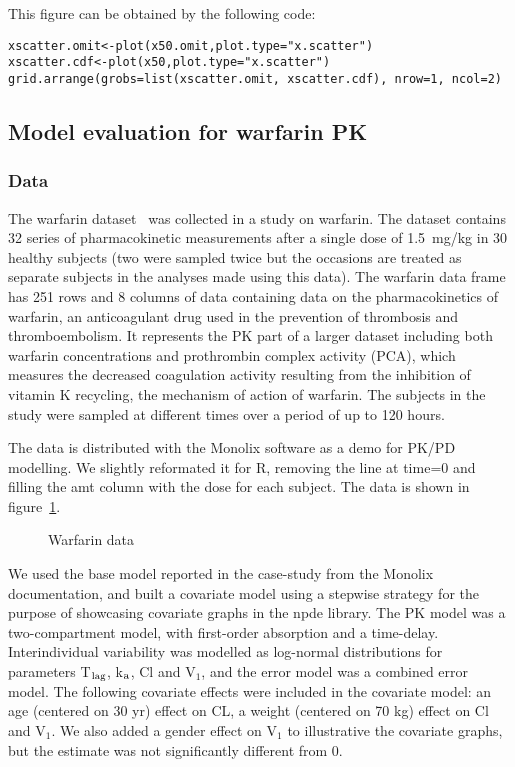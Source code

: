 This figure can be obtained by the following code:
\begin{verbatim}
xscatter.omit<-plot(x50.omit,plot.type="x.scatter")
xscatter.cdf<-plot(x50,plot.type="x.scatter")
grid.arrange(grobs=list(xscatter.omit, xscatter.cdf), nrow=1, ncol=2)
\end{verbatim} 

\clearpage
\subsection{Model evaluation for warfarin PK} \label{sec:warfarin}

\subsubsection{Data}

\hskip 18pt The warfarin dataset~\cite{OReilly68} was collected in a study on warfarin. The dataset contains 32 series of pharmacokinetic measurements after a single dose of 1.5~mg/kg in 30 healthy subjects (two were sampled twice but the occasions are treated as separate subjects in the analyses made using this data). 
The {\sf warfarin} data frame has 251 rows and 8 columns of data containing data on the pharmacokinetics of warfarin, an anticoagulant drug used in the prevention of thrombosis and thromboembolism. It represents the PK part of a larger dataset including both warfarin concentrations and prothrombin complex activity (PCA), which measures the decreased coagulation  activity resulting from the inhibition of vitamin K recycling, the mechanism of  action of warfarin. The subjects in the study were sampled at different times over a period of up to 120 hours.

The data is distributed with the {\sf Monolix} software as a demo for PK/PD modelling. We slightly reformated it for R, removing the line at time=0 and filling the {\sf amt} column with the dose for each subject. The data is shown in figure~\ref{fig:warfarin.data}.

\begin{figure}[!h]
\par\kern -0.2cm
\begin{center}
\end{center}
\caption{Warfarin data}\label{fig:warfarin.data}
\end{figure}


We used the base model reported in the case-study from the {\sf Monolix} documentation, and built a covariate model using a stepwise strategy for the purpose of showcasing covariate graphs in the {\sf npde} library.  The PK model was a two-compartment model, with first-order absorption and a time-delay. Interindividual variability was modelled as log-normal distributions for parameters T$_{\rm lag}$, k$_{\rm a}$, Cl and V$_1$, and the error model was a combined error model. The following covariate effects were included in the covariate model: an age (centered on 30 yr) effect on CL, a weight (centered on 70 kg) effect on Cl and V$_1$. We also added a gender effect on V$_1$ to illustrative the covariate graphs, but the estimate was not significantly different from 0.


